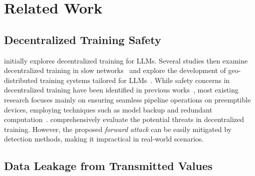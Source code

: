 \section{Related Work}
\subsection{Decentralized Training Safety}

\citet{yuan2022decentralized} initially explores decentralized training for LLMs. Several studies then examine decentralized training in slow networks~\cite{ryabinin2023swarm, wang2023cocktailsgd} and explore the development of geo-distributed training systems tailored for LLMs~\cite{gandhi2024improving, tang2024fusionllm}. While safety concerns in decentralized training have been identified in previous works~\cite{tang2023fusionai, borzunov2022training}, most existing research focuses mainly on ensuring seamless pipeline operations on preemptible devices, employing techniques such as model backup and redundant computation~\cite{thorpe2023bamboo, jang2023oobleck}. \citet{lu2024position} comprehensively evaluate the potential threats in decentralized training. However, the proposed \textit{forward attack} can be easily mitigated by detection methods, making it impractical in real-world scenarios.




\subsection{Data Leakage from Transmitted Values}

